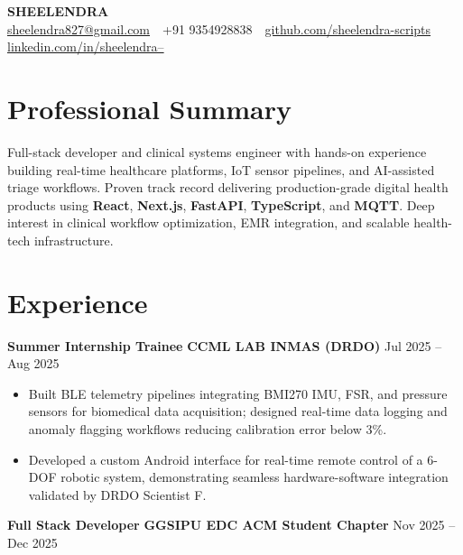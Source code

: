 \documentclass[10pt,letterpaper]{article}
\begin{document}
\begin{center}
{\fontsize{18}{20}\selectfont \textbf{SHEELENDRA}}\\
\vspace{2pt}
\small
\href{mailto:sheelendra827@gmail.com}{sheelendra827@gmail.com}
\,\textbar{}\,
+91 9354928838
\,\textbar{}\,
\href{https://github.com/sheelendra-scripts}{github.com/sheelendra-scripts}
\,\textbar{}\,
\href{https://linkedin.com/in/sheelendra--}{linkedin.com/in/sheelendra--}
\end{center}

\vspace{1pt}

\section*{Professional Summary}

Full-stack developer and clinical systems engineer with hands-on experience building real-time healthcare platforms, IoT sensor pipelines, and AI-assisted triage workflows. Proven track record delivering production-grade digital health products using \textbf{React}, \textbf{Next.js}, \textbf{FastAPI}, \textbf{TypeScript}, and \textbf{MQTT}. Deep interest in clinical workflow optimization, EMR integration, and scalable health-tech infrastructure.

\section*{Experience}

\textbf{Summer Internship Trainee} \textbar{} \textbf{CCML LAB \textbar{} INMAS (DRDO)} \hfill Jul 2025 -- Aug 2025

\begin{itemize}
    \item Built BLE telemetry pipelines integrating BMI270 IMU, FSR, and pressure sensors for biomedical data acquisition; designed real-time data logging and anomaly flagging workflows reducing calibration error below 3\%.
    \item Developed a custom Android interface for real-time remote control of a 6-DOF robotic system, demonstrating seamless hardware-software integration validated by DRDO Scientist F.
\end{itemize}

\vspace{1pt}

\textbf{Full Stack Developer} \textbar{} \textbf{GGSIPU EDC ACM Student Chapter} \hfill Nov 2025 -- Dec 2025
\end{document}
